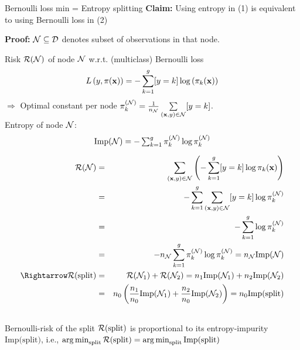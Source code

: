 \documentclass[11pt,compress,t,notes=noshow, xcolor=table]{beamer}
\begin{document}
\begin{vbframe}{Bernoulli loss min = Entropy splitting}
\textbf{Claim:} Using entropy in (1) 
    is equivalent to using Bernoulli loss in (2) %

\textbf{Proof:} %
$\mathcal{N} \subseteq \mathcal{D}$ denotes subset of observations in that node. 

Risk $\mathcal{R}(\mathcal{N})$ of node $\mathcal{N}$ w.r.t. (multiclass) Bernoulli loss  
$$
  L\left(y, \pi(\mathbf{x})\right) = -\sum_{k = 1}^g [y = k] \log \left(\pi_k(\mathbf{x})\right)
$$
$\Rightarrow$ Optimal constant per node $\pi_k^{(\mathcal{N})} = \frac{1}{n_{\mathcal{N}}} \sum\limits_{(\mathbf{x},y) \in \mathcal{N}} [y = k]$.\\

Entropy of node $\mathcal{N}$:
$$
\text{Imp}(\Np) = -\textstyle\sum_{k = 1}^g \pikN \log \pikN %
$$






\framebreak 
\begin{footnotesize}
\begin{eqnarray*}
\risk(\Np) &=& \sum_{\xy \in \Np} \left(- \sum_{k = 1}^g [y = k] \log \pi_k(\xv) \right) \\
&=& -\sum_{k = 1}^g \sum_{\xy \in \Np} [y = k]\log \pikN \\
&=& -\sum_{k = 1}^g \log \pikN %
\\
 &=& -n_{\Np} \sum_{k = 1}^g \pikN \log \pikN = n_\Np \text{Imp}(\Np)\\
 \Rightarrow \risk(\text{split}) &=& \risk(\Np_1) + \risk(\Np_2)  = n_1 \text{Imp}(\Np_1) + n_2 \text{Imp}(\Np_2)\\
 &=&n_0 \left(\frac{n_1}{n_0} \text{Imp}(\Np_1) + \frac{n_2}{n_0} \text{Imp}(\Np_2)\right) = n_0\text{Imp(split)}\\
\
\end{eqnarray*} 
Bernoulli-risk of the split $\mathcal{R}(\text{split})$ is proportional to its entropy-impurity $\text{Imp(split)}$, i.e., $\mathop{\mathrm{arg\,min}}_\text{split} \mathcal{R}(\text{split}) = \mathop{\mathrm{arg\,min}}_\text{split} \text{Imp(split)}$ \\

\end{footnotesize}



\end{vbframe}
\end{document}
